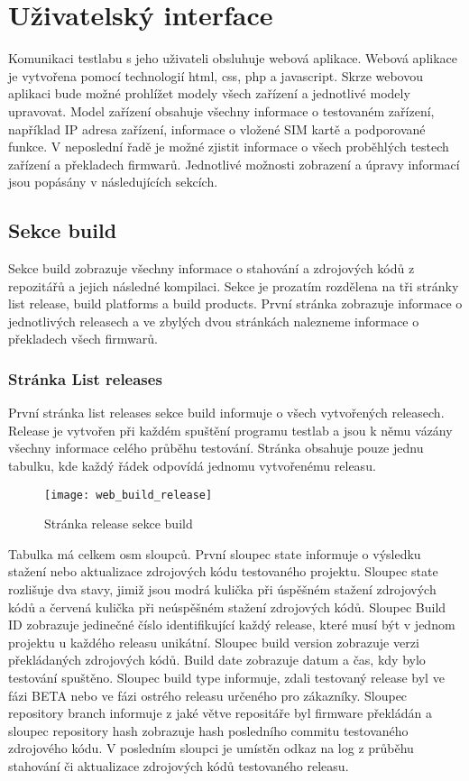 \chapter{Uživatelský interface}
Komunikaci testlabu s jeho uživateli obsluhuje webová aplikace. Webová aplikace je vytvořena pomocí technologií html, css, php a javascript. Skrze webovou aplikaci bude možné prohlížet modely všech zařízení a jednotlivé modely upravovat. Model zařízení obsahuje všechny informace o testovaném zařízení, například IP adresa zařízení, informace o vložené SIM kartě a podporované funkce. V neposlední řadě je možné zjistit informace o všech proběhlých testech zařízení a překladech firmwarů. Jednotlivé možnosti zobrazení a úpravy informací jsou popásány v následujících sekcích.

\section{Sekce build}
Sekce build zobrazuje všechny informace o stahování a zdrojových kódů z repozitářů a jejich následné kompilaci. Sekce je prozatím rozdělena na tři stránky list release, build platforms a build products. První stránka zobrazuje informace o jednotlivých releasech a ve zbylých dvou stránkách nalezneme informace o překladech všech firmwarů.

\subsection{Stránka List releases}
První stránka list releases sekce build informuje o všech vytvořených releasech. Release je vytvořen při každém spuštění programu testlab a jsou k němu vázány všechny informace celého průběhu testování. Stránka obsahuje pouze jednu tabulku, kde každý řádek odpovídá jednomu vytvořenému releasu.

\begin{figure}[h]
  \centering
  \texttt{[image: web\_build\_release]}
  \caption{Stránka release sekce build}
  \label{fig:web_build_release}
\end{figure}

Tabulka má celkem osm sloupců. První sloupec state informuje o výsledku stažení nebo aktualizace zdrojových kódu testovaného projektu. Sloupec state rozlišuje dva stavy, jimiž jsou modrá kulička při úspěšném stažení zdrojových kódů a červená kulička při neúspěšném stažení zdrojových kódů. Sloupec Build ID zobrazuje jedinečné číslo identifikující každý release, které musí být v jednom projektu u každého releasu unikátní. Sloupec build version zobrazuje verzi překládaných zdrojových kódů. Build date zobrazuje datum a čas, kdy bylo testování spuštěno. Sloupec build type informuje, zdali testovaný release byl ve fázi BETA nebo ve fázi ostrého releasu určeného pro zákazníky. Sloupec repository branch informuje z jaké větve repositáře byl firmware překládán a sloupec repository hash zobrazuje hash posledního commitu testovaného zdrojového kódu. V posledním sloupci je umístěn odkaz na log z průběhu stahování či aktualizace zdrojových kódů testovaného releasu.

